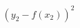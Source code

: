 \documentclass[preview]{standalone}
\begin{document}
\begin{align*}
(y_2 - f(x_2))^2
\end{align*}
\end{document}
